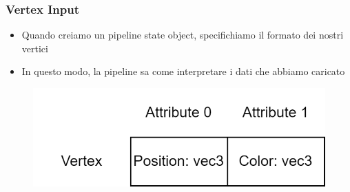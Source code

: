 \begin{frame}
\frametitle{Vertex Input}

\begin{itemize}
\item Quando creiamo un pipeline state object, specifichiamo il formato dei nostri vertici
\item In questo modo, la pipeline sa come interpretare i dati che abbiamo caricato
\end{itemize}

\begin{figure}[ht]
    \centering
    \includegraphics[scale=0.35]{images/SlidesVertices/VertexInputState.png}
\end{figure}

\end{frame}
